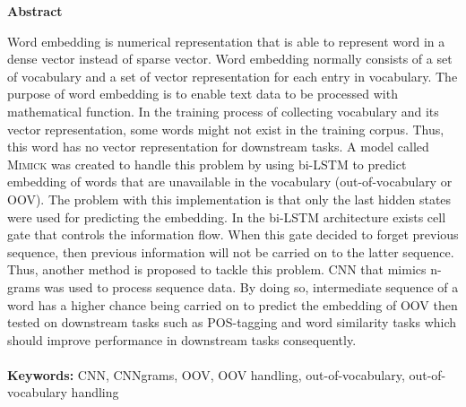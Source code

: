 \documentclass[a4paper,12pt]{report}
\newcommand{\linespacing}{1.3}
\renewcommand{\baselinestretch}{\linespacing}
\begin{document}





\newpage
{}
\tableofcontents

\newpage
\pagebreak
\hspace{0pt}
\vfill
\begin{center}
	\textbf{Abstract}
\end{center}
\par Word embedding is numerical representation that is able to
represent word in a dense vector instead of sparse vector. Word
embedding normally consists of a set of vocabulary and a set of vector
representation for each entry in vocabulary. The purpose of word
embedding is to enable text data to be processed with mathematical
function. In the training process of collecting vocabulary and its
vector representation, some words might not exist in the training
corpus. Thus, this word has no vector representation for downstream
tasks. A model called \textsc{Mimick} was created to handle this
problem by using bi-LSTM to predict embedding of words that are
unavailable in the vocabulary (out-of-vocabulary or OOV). The problem
with this implementation is that only the last hidden states were used
for predicting the embedding. In the bi-LSTM architecture exists cell
gate that controls the information flow. When this gate decided to
forget previous sequence, then previous information will not be
carried on to the latter sequence. Thus, another method is proposed to
tackle this problem. CNN that mimics n-grams was used to process
sequence data. By doing so, intermediate sequence of a word has a
higher chance being carried on to predict the embedding of OOV then
tested on downstream tasks such as POS-tagging and word similarity
tasks which should improve performance in downstream tasks
consequently. \\~\\
\textbf{Keywords:} CNN, CNNgrams, OOV, OOV handling,
out-of-vocabulary, out-of-vocabulary handling
\vfill
\hspace{0pt}
\pagebreak
\end{document}
